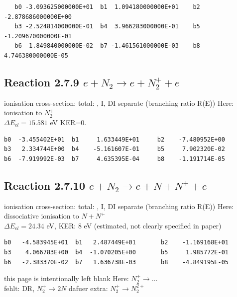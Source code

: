 \documentclass[12pt,dvips]{article}
\begin{document}
\begin{small}\begin{verbatim}
   b0 -3.093625000000E+01  b1  1.094180000000E+01    b2 -2.878686000000E+00
   b3 -2.524814000000E-01  b4  3.966283000000E-01    b5 -1.209670000000E-01
   b6  1.849840000000E-02  b7 -1.461561000000E-03    b8  4.746380000000E-05
\end{verbatim}\end{small}


\subsection{
Reaction 2.7.9  $e + N_2 \rightarrow e + N_2^+ + e$ }
ionisation cross-section: total: \cite{kn:Rapp1}, I, DI separate \cite{kn:Rapp2} (branching ratio R(E))
Here: ionisation to $N_2^+$ \\
$\Delta E_{el} = 15.581 $ eV KER=0.

\begin{small}\begin{verbatim}
b0  -3.455402E+01  b1     1.633449E+01     b2    -7.480952E+00
b3   2.334744E+00  b4    -5.161607E-01     b5     7.902320E-02
b6  -7.919992E-03  b7     4.635395E-04     b8    -1.191714E-05
\end{verbatim}\end{small}

\subsection{
Reaction 2.7.10  $e + N_2 \rightarrow e + N + N^+ +e$ }
ionisation cross-section: total: \cite{kn:Rapp1}, I, DI separate \cite{kn:Rapp2} (branching ratio R(E))
Here: dissociative ionisation to $N + N^+$ \\
$\Delta E_{el} = 24.34 $ eV, KER: 8 eV  (estimated, not clearly specified in paper)

\begin{small}\begin{verbatim}
b0   -4.583945E+01  b1   2.487449E+01       b2    -1.169168E+01
b3    4.066783E+00  b4  -1.070205E+00       b5     1.985772E-01
b6   -2.383370E-02  b7   1.636738E-03       b8    -4.849195E-05
\end{verbatim}\end{small}

\newpage
this page is intentionally left blank
\newpage
Here:  $N_2^+ \rightarrow \dots$\\
fehlt: DR, $N_2^+ \rightarrow 2 N$
dafuer extra:  $N_2^+ \rightarrow N_2^{2+}$
\end{document}
